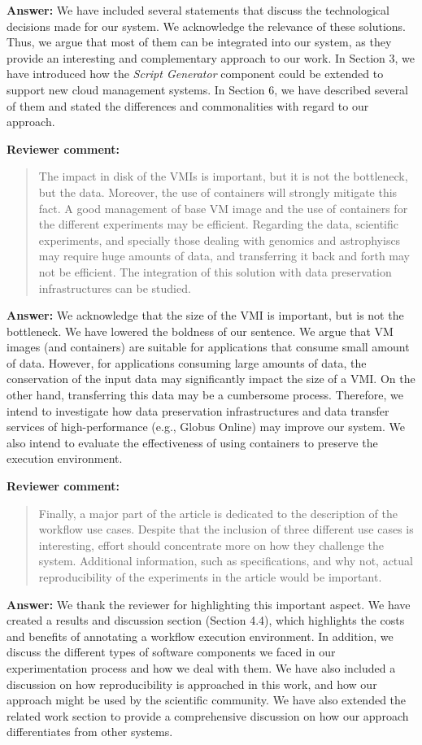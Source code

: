 \documentclass{letter}
\newenvironment{review}%
{\textbf{Reviewer comment:}\begin{quote}}%
{\end{quote}}%
\newcommand{\answer}[1]{%
      \textbf{Answer:} #1}
\begin{document}
\begin{letter}{}
\answer{We have included several statements that discuss the technological decisions made for our system. We acknowledge the relevance of these solutions. Thus, we argue that most of them can be integrated into our system, as they provide an interesting and complementary approach to our work. In Section 3, we have introduced how the {\it Script Generator} component could be extended to support new cloud management systems. In Section 6, we have described several of them and stated the differences and commonalities with regard to our approach.}


\begin{review}
The impact in disk of the VMIs is important, but it is not the bottleneck, but the data. Moreover, the use of containers will strongly mitigate this fact. A good management of base VM image and the use of containers for the different experiments may be efficient. Regarding the data, scientific experiments, and specially those dealing with genomics and astrophyiscs may require huge amounts of data, and transferring it back and forth may not be efficient. The integration of this solution with data preservation infrastructures can be studied.
\end{review}

\answer{We acknowledge that the size of the VMI is important, but is not the bottleneck. We have lowered the boldness of our sentence. We argue that VM images (and containers) are suitable for applications that consume small amount of data. However, for applications consuming large amounts of data, the conservation of the input data may significantly impact the size of a VMI. On the other hand, transferring this data may be a cumbersome process. Therefore, we intend to investigate how data preservation infrastructures and data transfer services of high-performance (e.g., Globus Online) may improve our system. We also intend to evaluate the effectiveness of using containers to preserve the execution environment.}


\begin{review}
Finally, a major part of the article is dedicated to the description of the workflow use cases. Despite that the inclusion of three different use cases is interesting, effort should concentrate more on how they challenge the system. Additional information, such as specifications, and why not, actual reproducibility of the experiments in the article would be important.
\end{review}

\answer{We thank the reviewer for highlighting this important aspect. We have created a results and discussion section (Section 4.4), which highlights the costs and benefits of annotating a workflow execution environment. In addition, we discuss the different types of software components we faced in our experimentation process and how we deal with them. We have also included a discussion on how reproducibility is approached in this work, and how our approach might be used by the scientific community. We have also extended the related work section to provide a comprehensive discussion on how our approach differentiates from other systems.}


\end{letter}
\end{document}
